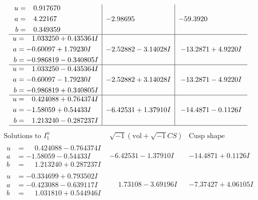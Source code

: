 \documentclass[1p]{elsarticle_modified}
\theoremstyle{definition}
\newcommand{\I}{\sqrt{-1}}
\begin{document}
$$\begin{array}{c|c|c}
\begin{aligned}
u &= \phantom{-}0.917670\phantom{ +0.000000I} \\
a &= \phantom{-}4.22167\phantom{ +0.000000I} \\
b &= \phantom{-}0.349359\phantom{ +0.000000I}\end{aligned}
 & -2.98695\phantom{ +0.000000I} & -59.3920\phantom{ +0.000000I} \\ \hline\begin{aligned}
u &= \phantom{-}1.033250 + 0.435364 I \\
a &= -0.60097 + 1.79230 I \\
b &= -0.986819 - 0.340805 I\end{aligned}
 & -2.52882 - 3.14028 I & -13.2871 + 4.9220 I \\ \hline\begin{aligned}
u &= \phantom{-}1.033250 - 0.435364 I \\
a &= -0.60097 - 1.79230 I \\
b &= -0.986819 + 0.340805 I\end{aligned}
 & -2.52882 + 3.14028 I & -13.2871 - 4.9220 I \\ \hline\begin{aligned}
u &= \phantom{-}0.424088 + 0.764374 I \\
a &= -1.58059 + 0.54433 I \\
b &= \phantom{-}1.213240 - 0.287237 I\end{aligned}
 & -6.42531 + 1.37910 I & -14.4871 - 0.1126 I\\
 \hline 
 \end{array}$$\newpage$$\begin{array}{c|c|c}  
\text{Solutions to }I^u_{1}& \I (\text{vol} + \sqrt{-1}CS) & \text{Cusp shape}\\
 \hline 
\begin{aligned}
u &= \phantom{-}0.424088 - 0.764374 I \\
a &= -1.58059 - 0.54433 I \\
b &= \phantom{-}1.213240 + 0.287237 I\end{aligned}
 & -6.42531 - 1.37910 I & -14.4871 + 0.1126 I \\ \hline\begin{aligned}
u &= -0.334699 + 0.793502 I \\
a &= -0.423088 - 0.639117 I \\
b &= \phantom{-}1.031810 + 0.544946 I\end{aligned}
 & \phantom{-}1.73108 - 3.69196 I & -7.37427 + 4.06105 I \\ \hline\begin{aligned}

\end{aligned}
\end{array}$$
\end{document}
